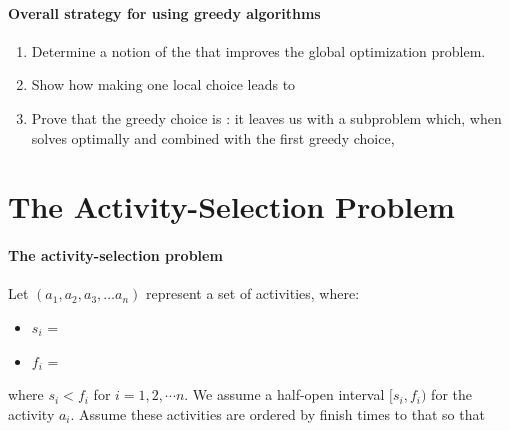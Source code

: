 \documentclass[11  pt]{article}
\begin{document}
\paragraph{Overall strategy for using greedy algorithms}
\begin{enumerate}
	\item Determine a notion of the  that improves the global optimization problem.
	\item Show how making one local choice leads to 
	\item Prove that the greedy choice is : it leaves us with a subproblem which, when solves optimally and combined with the first greedy choice, 
	
\end{enumerate}

\newpage
%	
%	
%	
%

\section{The Activity-Selection Problem}

\paragraph{The activity-selection problem}
Let $(a_1, a_2, a_3, \hdots a_n)$ represent a set of activities, where:
\begin{itemize}
	\itemsep = 3em
	\item $s_i$ = %
	\item $f_i$ = %
\end{itemize} 
where $s_i < f_i$ for $i = 1,2,\cdots n$. We assume a half-open interval $[s_i, f_i)$ for the activity $a_i$. Assume these activities are ordered by finish times to that so that
\end{document}
